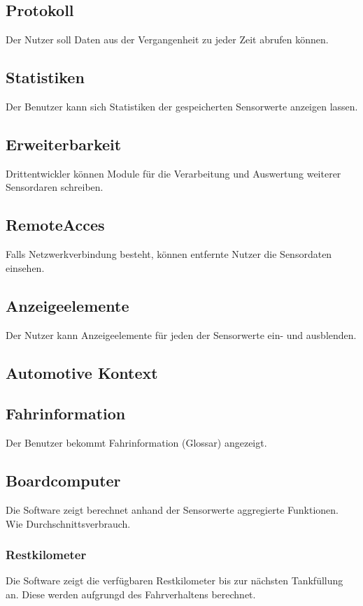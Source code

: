 \documentclass[pflichtenheft.tex]{subfiles}
\begin{document}
\subsection{\mkfa Protokoll} Der Nutzer soll Daten aus der Vergangenheit zu jeder Zeit abrufen können.

\subsection{\mkfa Statistiken} Der Benutzer kann sich Statistiken der gespeicherten Sensorwerte anzeigen lassen.

\subsection{\mkfa Erweiterbarkeit} Drittentwickler können Module für die Verarbeitung und Auswertung weiterer Sensordaren schreiben.

\subsection{\mkfa RemoteAcces} Falls Netzwerkverbindung besteht, können entfernte Nutzer die Sensordaten einsehen.

\subsection{\mkfa Anzeigeelemente} Der Nutzer kann Anzeigeelemente für jeden der Sensorwerte ein- und ausblenden.

\subsection{Automotive Kontext}

\subsection{\mkfa Fahrinformation} Der Benutzer bekommt Fahrinformation (Glossar) angezeigt.

\subsection{\mkfa Boardcomputer} Die Software zeigt berechnet anhand der Sensorwerte aggregierte Funktionen. Wie Durchschnittsverbrauch.

\subsubsection{\mkfa Restkilometer} Die Software zeigt die verfügbaren Restkilometer bis zur nächsten Tankfüllung an. Diese werden aufgrungd des Fahrverhaltens berechnet.
\end{document}
